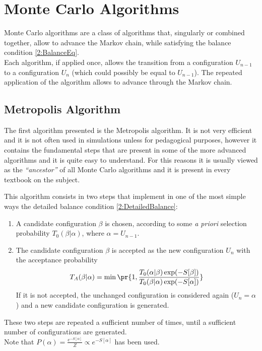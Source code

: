 \section{Monte Carlo Algorithms\label{Sec2:MonteCarlo}}
Monte Carlo algorithms are a class of algorithms that, singularly or combined together, allow to advance the Markov chain, while satisfying the balance condition \eqref{2:BalanceEq}.\\
Each algorithm, if applied once, allows the transition from a configuration $U_{n-1}$ to a configuration $U_n$ (which could possibly be equal to $U_{n-1}$). The repeated application of the algorithm allows to advance through the Markov chain.

\subsection{Metropolis Algorithm}
The first algorithm presented is the Metropolis algorithm. It is not very efficient and it is not often used in simulations unless for pedagogical purposes, however it contains the fundamental steps that are present in some of the more advanced algorithms and it is quite easy to understand.
For this reasons it is usually viewed as the \emph{``ancestor''} of all Monte Carlo algorithms and it is present in every textbook on the subject.

This algorithm consists in two steps that implement in one of the most simple ways the detailed balance condition \eqref{2:DetailedBalance}:
\begin{enumerate}[label=\arabic*)]
    \item A candidate configuration $\beta$ is chosen, according to some \emph{a priori} selection probability $T_0(\beta|\alpha)$, where $\alpha=U_{n-1}$.
    \item The candidate configuration $\beta$ is accepted as the new configuration $U_n$ with the acceptance probability
          \begin{equation}
              T_A(\beta|\alpha) = \min\pr{1,\frac{T_0(\alpha|\beta)\exp(-S[\beta])}{T_0(\beta|\alpha)\exp(-S[\alpha])}} \label{2:MetropolisAccProb}
          \end{equation}
          If it is not accepted, the unchanged configuration is considered again ($U_n=\alpha$) and a new candidate configuration is generated.
\end{enumerate}
These two steps are repeated a sufficient number of times, until a sufficient number of configurations are generated.\\
Note that $P(\alpha) = \frac{e^{-S[\alpha]}}{Z} \varpropto e^{-S[\alpha]}$ has been used.

